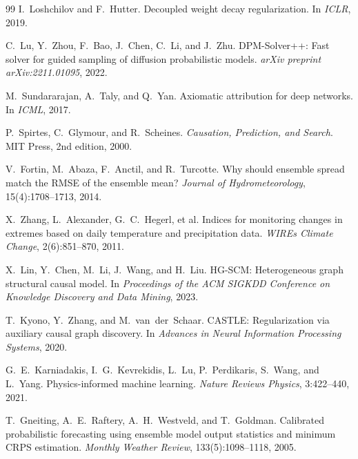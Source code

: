 \documentclass[14pt,a4paper,openany]{extreport}
\theoremstyle{definition}
\begin{document}
\begin{thebibliography}{99}
 I.~Loshchilov and F.~Hutter. Decoupled weight decay regularization. In \emph{ICLR}, 2019.

 C.~Lu, Y.~Zhou, F.~Bao, J.~Chen, C.~Li, and J.~Zhu. DPM-Solver++: Fast solver for guided sampling of diffusion probabilistic models. \emph{arXiv preprint arXiv:2211.01095}, 2022.

 M.~Sundararajan, A.~Taly, and Q.~Yan. Axiomatic attribution for deep networks. In \emph{ICML}, 2017.

 P.~Spirtes, C.~Glymour, and R.~Scheines. \emph{Causation, Prediction, and Search}. MIT Press, 2nd edition, 2000.

 V.~Fortin, M.~Abaza, F.~Anctil, and R.~Turcotte. Why should ensemble spread match the RMSE of the ensemble mean? \emph{Journal of Hydrometeorology}, 15(4):1708--1713, 2014.

 X.~Zhang, L.~Alexander, G.~C.~Hegerl, et al. Indices for monitoring changes in extremes based on daily temperature and precipitation data. \emph{WIREs Climate Change}, 2(6):851--870, 2011.

 X.~Lin, Y.~Chen, M.~Li, J.~Wang, and H.~Liu. HG-SCM: Heterogeneous graph structural causal model. In \emph{Proceedings of the ACM SIGKDD Conference on Knowledge Discovery and Data Mining}, 2023.

 T.~Kyono, Y.~Zhang, and M.~van~der~Schaar. CASTLE: Regularization via auxiliary causal graph discovery. In \emph{Advances in Neural Information Processing Systems}, 2020.

 G.~E.~Karniadakis, I.~G.~Kevrekidis, L.~Lu, P.~Perdikaris, S.~Wang, and L.~Yang. Physics-informed machine learning. \emph{Nature Reviews Physics}, 3:422--440, 2021.

 T.~Gneiting, A.~E.~Raftery, A.~H.~Westveld, and T.~Goldman. Calibrated probabilistic forecasting using ensemble model output statistics and minimum CRPS estimation. \emph{Monthly Weather Review}, 133(5):1098--1118, 2005.

\end{thebibliography}
\end{document}

